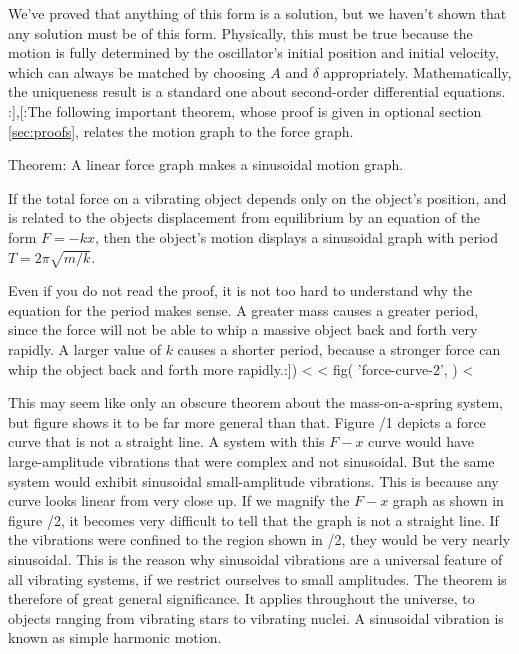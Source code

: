 We've proved that anything of this form is a solution, but we haven't shown that any solution must
be of this form. Physically, this must be true because the motion is fully determined by the
oscillator's initial position and initial velocity, which can always be matched by choosing
$A$ and $\delta$ appropriately. Mathematically, the uniqueness result is a standard one about
second-order differential equations.
:],[:The following important theorem, whose proof is given in
optional section \ref{sec:proofs}, relates the motion graph to the force graph.

\begin{lessimportant}{Theorem: A linear
force graph makes a sinusoidal motion graph.}

\noindent If the total force on a vibrating object depends only on the
object's position, and is related to the objects displacement
from equilibrium by an equation of the form $F=-kx$,
then the object's motion displays a sinusoidal graph with period $T=2\pi\sqrt{m/k}$.
\end{lessimportant}

Even if you do not read the proof, it is not too hard to
understand why the equation for the period makes sense. A
greater mass causes a greater period, since the force will
not be able to whip a massive object back and forth very
rapidly. A larger value of $k$ causes a shorter period,
because a stronger force can whip the object back and forth more rapidly.:])
<%
<%
  fig(
    'force-curve-2',
  )
<%

This may seem like only an obscure theorem about the
mass-on-a-spring system, but figure  shows it to
be far more general than that. Figure /1 depicts a force
curve that is not a straight line. A system with this $F-x$
curve would have large-amplitude vibrations that were
complex and not sinusoidal. But the same system would
exhibit sinusoidal small-amplitude vibrations. This is
because any curve looks linear from very close up. If we
magnify the $F-x$ graph as shown in figure /2, it becomes very
difficult to tell that the graph is not a straight line. If
the vibrations were confined to the region shown in /2,
they would be very nearly sinusoidal. This is the reason why
sinusoidal vibrations are a universal feature of all
vibrating systems, if we restrict ourselves to small
amplitudes. The theorem is therefore of great general
significance. It applies throughout the universe, to objects
ranging from vibrating stars to vibrating nuclei. A
sinusoidal vibration is known as simple harmonic motion.

